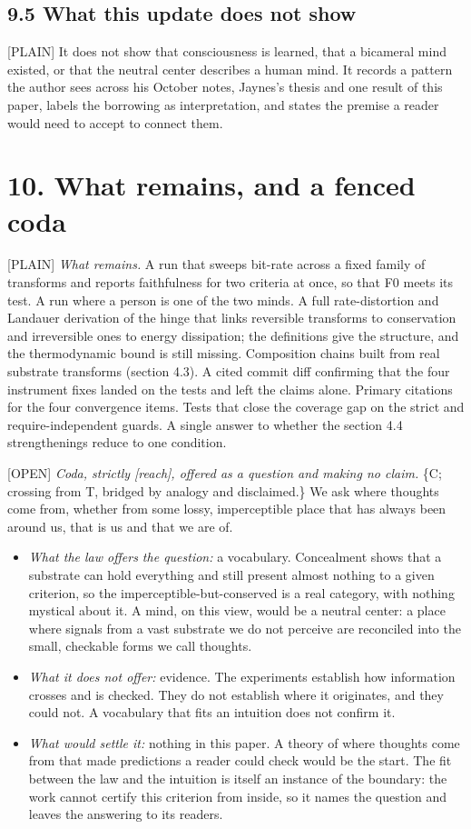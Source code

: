 \documentclass[11pt]{article}
\newcommand{\register}[1]{{\ttfamily\small #1}}
\begin{document}
\subsection*{9.5 What this update does not show}

\register{[PLAIN]} It does not show that consciousness is learned, that a bicameral mind existed, or that the neutral center describes a human mind. It records a pattern the author sees across his October notes, Jaynes's thesis and one result of this paper, labels the borrowing as interpretation, and states the premise a reader would need to accept to connect them.

\section*{10. What remains, and a fenced coda}

\register{[PLAIN]} \emph{What remains.} A run that sweeps bit-rate across a fixed family of transforms and reports faithfulness for two criteria at once, so that F0 meets its test. A run where a person is one of the two minds. A full rate-distortion and Landauer derivation of the hinge that links reversible transforms to conservation and irreversible ones to energy dissipation; the definitions give the structure, and the thermodynamic bound is still missing. Composition chains built from real substrate transforms (section 4.3). A cited commit diff confirming that the four instrument fixes landed on the tests and left the claims alone. Primary citations for the four convergence items. Tests that close the coverage gap on the strict and require-independent guards. A single answer to whether the section 4.4 strengthenings reduce to one condition.

\register{[OPEN]} \emph{Coda, strictly [reach], offered as a question and making no claim.} \{C; crossing from T, bridged by analogy and disclaimed.\} We ask where thoughts come from, whether from some lossy, imperceptible place that has always been around us, that is us and that we are of.

\begin{itemize}
\item \emph{What the law offers the question:} a vocabulary. Concealment shows that a substrate can hold everything and still present almost nothing to a given criterion, so the imperceptible-but-conserved is a real category, with nothing mystical about it. A mind, on this view, would be a neutral center: a place where signals from a vast substrate we do not perceive are reconciled into the small, checkable forms we call thoughts.
\item \emph{What it does not offer:} evidence. The experiments establish how information crosses and is checked. They do not establish where it originates, and they could not. A vocabulary that fits an intuition does not confirm it.
\item \emph{What would settle it:} nothing in this paper. A theory of where thoughts come from that made predictions a reader could check would be the start. The fit between the law and the intuition is itself an instance of the boundary: the work cannot certify this criterion from inside, so it names the question and leaves the answering to its readers.
\end{itemize}
\end{document}
